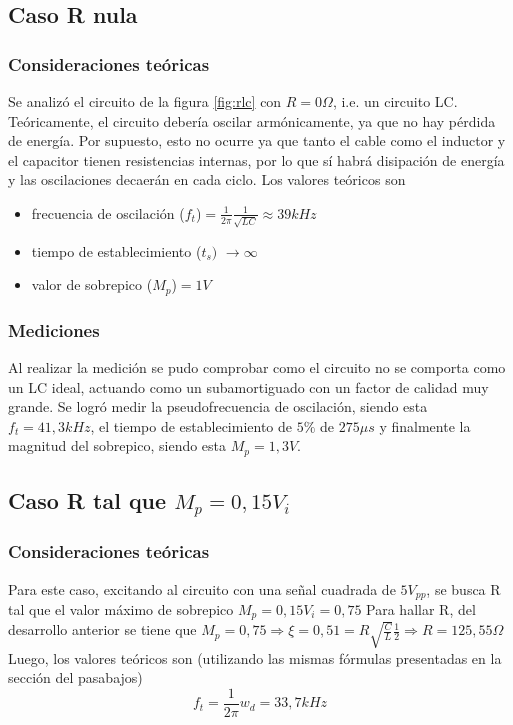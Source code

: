 \subsection{Caso R nula}
\subsubsection{Consideraciones teóricas}
Se analizó el circuito de la figura \ref{fig:rlc} con $R=0\Omega$, i.e. un circuito LC. Teóricamente, el circuito debería oscilar armónicamente, ya que no hay pérdida de energía. Por supuesto, esto no ocurre ya que tanto el cable como el inductor y el capacitor tienen resistencias internas, por lo que sí habrá disipación de energía y las oscilaciones decaerán en cada ciclo.
Los valores teóricos son
\begin{itemize}
  \item frecuencia de oscilación ($f_t$)$=\frac{1}{2\pi}\frac{1}{\sqrt{LC}}\approx 39 kHz$
  \item tiempo de establecimiento ($t_s)$ $\rightarrow \infty$
  \item valor de sobrepico ($M_p$)$=1 V$
\end{itemize}
\subsubsection{Mediciones}

Al realizar la medición se pudo comprobar como el circuito no se comporta como un LC ideal, actuando como un subamortiguado con un factor de calidad muy grande. Se logró medir la pseudofrecuencia de oscilación, siendo esta $f_t= 41,3 kHz$, el tiempo de establecimiento de $5\%$ de $275\mu s$ y finalmente la magnitud del sobrepico, siendo esta $M_p=1,3 V$.


\subsection{Caso R tal que $M_p=0,15V_i$}
\subsubsection{Consideraciones teóricas}
Para este caso, excitando al circuito con una señal cuadrada de $5 V_{pp}$, se busca R tal que el valor máximo de sobrepico $M_p=0,15V_i=0,75$
Para hallar R, del desarrollo anterior se tiene que $M_p=0,75\Rightarrow \xi=0,51=R\sqrt{\frac{C}{L}}\frac{1}{2} \Rightarrow R=125,55\Omega $
Luego, los valores teóricos son (utilizando las mismas fórmulas presentadas en la sección del pasabajos) 
\begin{equation}
    f_t=\frac{1}{2\pi}w_d=33,7 kHz
\end{equation}

